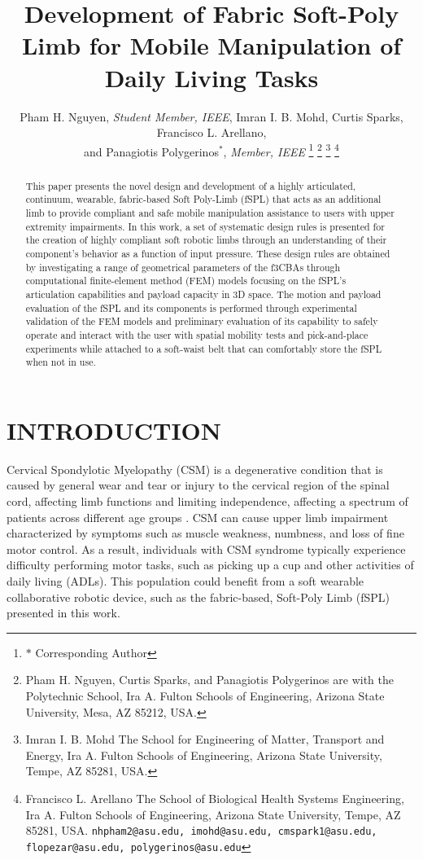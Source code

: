 \documentclass[letterpaper, 10 pt, conference]{ieeeconf}  %
\title{\LARGE \bf
Development of Fabric Soft-Poly Limb for Mobile Manipulation of Daily Living Tasks  
}
\author{Pham H. Nguyen, \textit{Student Member, IEEE}, Imran I. B. Mohd, Curtis Sparks, Francisco L. Arellano,\\ and Panagiotis Polygerinos$^{*}$, \textit{Member, IEEE}%
\thanks{$*$ Corresponding Author}%
\thanks{Pham H. Nguyen, Curtis Sparks, and Panagiotis Polygerinos are with the Polytechnic School, Ira A. Fulton Schools of Engineering, Arizona State University, Mesa, AZ 85212, USA.} 
\thanks{Imran I. B. Mohd The School for Engineering of Matter, Transport and Energy, Ira A. Fulton Schools of Engineering, Arizona State University, Tempe, AZ 85281, USA.}
\thanks{Francisco L. Arellano The School of Biological Health Systems Engineering, Ira A. Fulton Schools of Engineering, Arizona State University, Tempe, AZ 85281, USA.
        {\tt\small nhpham2@asu.edu, imohd@asu.edu, cmspark1@asu.edu, flopezar@asu.edu, polygerinos@asu.edu}}%
}
\begin{document}
\maketitle
\thispagestyle{empty}
\pagestyle{empty}


\begin{abstract}

This paper presents the novel design and development of a highly articulated, continuum, wearable, fabric-based Soft Poly-Limb (fSPL) that acts as an additional limb to provide compliant and safe mobile manipulation assistance to users with upper extremity impairments. In this work, a set of systematic design rules is presented for the creation of highly compliant soft robotic limbs through an understanding of their component’s behavior as a function of input pressure. These design rules are obtained by investigating a range of geometrical parameters of the f3CBAs through computational finite-element method (FEM) models focusing on the fSPL's articulation capabilities and payload capacity in 3D space.  The motion and payload evaluation of the fSPL and its components is performed through experimental validation of the FEM models and preliminary evaluation of its capability to safely operate and interact with the user with spatial mobility tests and pick-and-place experiments while attached to a soft-waist belt that can comfortably store the fSPL when not in use.

\end{abstract}

\section{INTRODUCTION}

Cervical Spondylotic Myelopathy (CSM) is a degenerative condition that is caused by general wear and tear or injury to the cervical region of the spinal cord, affecting limb functions and limiting independence, affecting a spectrum of patients across different age groups \cite{lubelski2016}. CSM can cause upper limb impairment characterized by symptoms such as muscle weakness, numbness, and loss of fine motor control. As a result, individuals with CSM syndrome typically experience difficulty performing motor tasks, such as picking up a cup and other activities of daily living (ADLs). This population could benefit from a soft wearable collaborative robotic device, such as the fabric-based, Soft-Poly Limb (fSPL) presented in this work.
\end{document}
